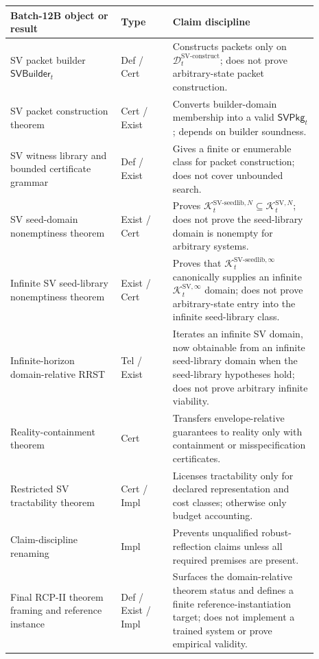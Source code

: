 \documentclass[11pt]{article}
\newcommand{\1}{\mathbf{1}}
\providecommand{\Dcal}{\mathcal{D}}
\providecommand{\Kcal}{\mathcal{K}}
\begin{document}
\begin{center}
\begin{tabular}{@{}p{0.32\linewidth}p{0.15\linewidth}p{0.42\linewidth}@{}}
\toprule
\textbf{Batch-12B object or result} & \textbf{Type} & \textbf{Claim discipline}\\
\midrule
SV packet builder \(\mathsf{SVBuilder}_t\) & Def / Cert & Constructs packets only on \(\Dcal_t^{\mathrm{SV\mbox{-}construct}}\); does not prove arbitrary-state packet construction.\\
SV packet construction theorem & Cert / Exist & Converts builder-domain membership into a valid \(\mathsf{SVPkg}_t\); depends on builder soundness.\\
SV witness library and bounded certificate grammar & Def / Exist & Gives a finite or enumerable class for packet construction; does not cover unbounded search.\\
SV seed-domain nonemptiness theorem & Exist / Cert & Proves \(\Kcal_t^{\mathrm{SV\mbox{-}seedlib},N}\subseteq\Kcal_t^{\mathrm{SV},N}\); does not prove the seed-library domain is nonempty for arbitrary systems.\\
Infinite SV seed-library nonemptiness theorem & Exist / Cert & Proves that \(\Kcal_t^{\mathrm{SV\mbox{-}seedlib},\infty}\) canonically supplies an infinite \(\Kcal_t^{\mathrm{SV},\infty}\) domain; does not prove arbitrary-state entry into the infinite seed-library class.\\
Infinite-horizon domain-relative RRST & Tel / Exist & Iterates an infinite SV domain, now obtainable from an infinite seed-library domain when the seed-library hypotheses hold; does not prove arbitrary infinite viability.\\
Reality-containment theorem & Cert & Transfers envelope-relative guarantees to reality only with containment or misspecification certificates.\\
Restricted SV tractability theorem & Cert / Impl & Licenses tractability only for declared representation and cost classes; otherwise only budget accounting.\\
Claim-discipline renaming & Impl & Prevents unqualified robust-reflection claims unless all required premises are present.\\
Final RCP-II theorem framing and reference instance & Def / Exist / Impl & Surfaces the domain-relative theorem status and defines a finite reference-instantiation target; does not implement a trained system or prove empirical validity.\\
\bottomrule
\end{tabular}
\end{center}
\end{document}
